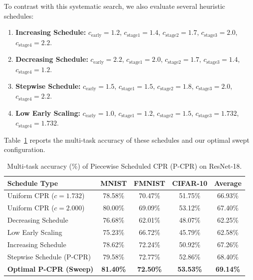 \documentclass{article}
\theoremstyle{plain}
\theoremstyle{definition}
\theoremstyle{remark}
\begin{document}
To contrast with this systematic search, we also evaluate several heuristic schedules:
\begin{enumerate}
\item \textbf{Increasing Schedule:} $c_{\text{early}} = 1.2$, $c_{\text{stage1}} = 1.4$, $c_{\text{stage2}} = 1.7$, $c_{\text{stage3}} = 2.0$, $c_{\text{stage4}} = 2.2$.
\item \textbf{Decreasing Schedule:} $c_{\text{early}} = 2.2$, $c_{\text{stage1}} = 2.0$, $c_{\text{stage2}} = 1.7$, $c_{\text{stage3}} = 1.4$, $c_{\text{stage4}} = 1.2$.
\item \textbf{Stepwise Schedule:} $c_{\text{early}} = 1.5$, $c_{\text{stage1}} = 1.5$, $c_{\text{stage2}} = 1.8$, $c_{\text{stage3}} = 2.0$, $c_{\text{stage4}} = 2.2$.
\item \textbf{Low Early Scaling:} $c_{\text{early}} = 1.0$, $c_{\text{stage1}} = 1.2$, $c_{\text{stage2}} = 1.5$, $c_{\text{stage3}} = 1.732$, $c_{\text{stage4}} = 1.732$.
\end{enumerate}

Table~\ref{table:piecewise_results} reports the multi-task accuracy of these schedules and our optimal swept configuration.

\begin{table}[ht]
\caption{Multi-task accuracy (\%) of Piecewise Scheduled CPR (P-CPR) on ResNet-18.}
\label{table:piecewise_results}
\vskip 0.15in
\begin{center}
\begin{small}
\begin{tabular}{lcccc}
\toprule
Schedule Type & MNIST & FMNIST & CIFAR-10 & Average \\
\midrule
Uniform CPR ($c=1.732$) & 78.58\% & 70.47\% & 51.75\% & 66.93\% \\
Uniform CPR ($c=2.000$) & 80.00\% & 69.09\% & 53.12\% & 67.40\% \\
\midrule
Decreasing Schedule & 76.68\% & 62.01\% & 48.07\% & 62.25\% \\
Low Early Scaling & 75.23\% & 66.72\% & 45.79\% & 62.58\% \\
Increasing Schedule & 78.62\% & 72.24\% & 50.92\% & 67.26\% \\
Stepwise Schedule (P-CPR) & 79.58\% & 72.77\% & 52.86\% & 68.40\% \\
\textbf{Optimal P-CPR (Sweep)} & \textbf{81.40\%} & \textbf{72.50\%} & \textbf{53.53\%} & \textbf{69.14\%} \\
\bottomrule
\end{tabular}
\end{small}
\end{center}
\vskip -0.1in
\end{table}
\end{document}
